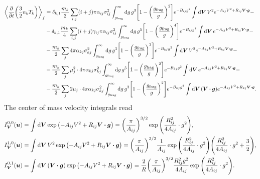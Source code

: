 \documentclass[aps,prl,preprint,groupedaddress,10pt]{revtex4-2}
\begin{document}
\begin{equation}
    \begin{split}
        \avg{\pdv{t}\pqty{\frac{3}{2}n_kT_k}}_f&=\delta_{k,1}\frac{m_k}{2}
        \sum_{i,j}(i+j)\pi\alpha_{ij}\sigma_{ij}^2\int_{\ltx{g}{frag}}^{\infty}
        \dd{g}g^3\bqty{1-\pqty{\frac{\ltx{g}{frag}}{g}}^2}e^{-B_{ij}g^2}
        \int\dd{\bV}V^2e^{-A_{ij}V^2+R_{ij}\bV\vdot\bg}-\\
        &-\delta_{k,1}\frac{m_k}{4}
        \sum_{i,j}(i+j)\gamma_{ij}\pi\alpha_{ij}\sigma_{ij}^2\int_{\ltx{g}{frag}}^{\infty}
        \dd{g}g^5\bqty{1-\pqty{\frac{\ltx{g}{frag}}{g}}^4}e^{-B_{ij}g^2}
        \int\dd{\bV}e^{-A_{ij}V^2+R_{ij}\bV\vdot\bg}-\\
        &-\frac{m_k}{2}\sum_{j}4\pi\alpha_{kj}\sigma_{kj}^2\int_{\ltx{g}{frag}}^{\infty}
        \dd{g}g^3\bqty{1-\pqty{\frac{\ltx{g}{frag}}{g}}^2}e^{-B_{kj}g^2}
        \int\dd{\bV}V^2e^{-A_{kj}V^2+R_{kj}\bV\vdot\bg}-\\
        &-\frac{m_k}{2}\sum_{j}\mu_j^2\cdot4\pi\alpha_{kj}\sigma_{kj}^2
        \int_{\ltx{g}{frag}}^{\infty}\dd{g}g^5
        \bqty{1-\pqty{\frac{\ltx{g}{frag}}{g}}^2}e^{-B_{kj}g^2}
        \int\dd{\bV}e^{-A_{kj}V^2+R_{kj}\bV\vdot\bg}-\\
        &-\frac{m_k}{2}\sum_{j}2\mu_j\cdot4\pi\alpha_{kj}\sigma_{kj}^2
        \int_{\ltx{g}{frag}}^{\infty}
        \dd{g}g^3\bqty{1-\pqty{\frac{\ltx{g}{frag}}{g}}^2}e^{-B_{kj}g^2}\int\dd{\bV}
        \pqty{\bV\vdot\bg}e^{-A_{kj}V^2+R_{kj}\bV\vdot\bg}.
    \end{split}
\end{equation}
The center of mass velocity integrals read
\begin{equation}
    \begin{split}
        I_{\bV}^{0,0}(\bu)&=\int\dd{\bV}\exp\pqty{-A_{ij}V^2+R_{ij}\bV\vdot\bg}=
        \pqty{\frac{\pi}{A_{ij}}}^{3/2}\exp\pqty{\frac{R_{ij}^2}{4A_{ij}}\cdot g^2},\\
        I_{\bV}^{1,0}(\bu)&=\int\dd{\bV}V^2\exp\pqty{-A_{ij}V^2+R_{ij}\bV\vdot\bg}=
        \pqty{\frac{\pi}{A_{ij}}}^{3/2}\frac{1}{A_{ij}}
        \exp\pqty{\frac{R_{ij}^2}{4A_{ij}}\cdot g^2}
        \pqty{\frac{R_{ij}^2}{4A_{ij}}\cdot g^2+\frac{3}{2}},\\
        I_{\bV}^{0,1}(\bu)&=\int\dd{\bV}(\bV\vdot\bg)
        \exp\pqty{-A_{ij}V^2+R_{ij}\bV\vdot\bg}=
        \frac{2}{R}\pqty{\frac{\pi}{A_{ij}}}^{3/2}\frac{R_{ij}^2g^2}{4A_{ij}}
        \exp\pqty{\frac{R_{ij}^2}{4A_{ij}}\cdot g^2}.
    \end{split}
\end{equation}
\end{document}
